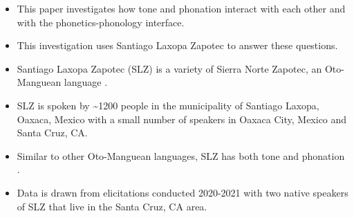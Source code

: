 \documentclass[12pt, letterpaper]{article}
\begin{document}
\begin{itemize}
	\item This paper investigates how tone and phonation interact with each other and with the phonetics-phonology interface. 

	\item This investigation uses Santiago Laxopa Zapotec to answer these questions.

	\item Santiago Laxopa Zapotec (SLZ) is a variety of Sierra Norte Zapotec, an Oto-Manguean language \citep{adlerDerivationVerbInitiality2018,sichelFeaturalLifeNominals2020}.

	\item SLZ is spoken by \textasciitilde 1200 people in the municipality of Santiago Laxopa, Oaxaca, Mexico with a small number of speakers in Oaxaca City, Mexico and Santa Cruz, CA. 

	\item Similar to other Oto-Manguean languages, SLZ has both tone and phonation \citep{campbellMesoAmericaLinguisticArea1986,stolzMesoamericaLinguisticArea2001,campbellOtomangueanHistoricalLinguistics2017a,campbellOtomangueanHistoricalLinguistics2017}. 

	\item Data is drawn from elicitations conducted 2020-2021 with two native speakers of SLZ that live in the Santa Cruz, CA area.  

\end{itemize}

\end{document}
